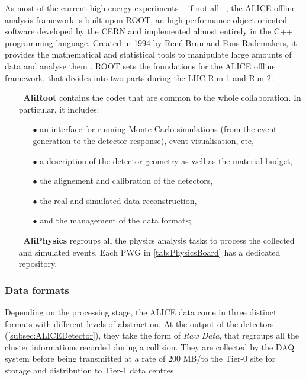 As most of the current high-energy experiments -- if not all --, the ALICE offline analysis framework is built upon ROOT, an high-performance object-oriented software developed by the CERN and implemented almost entirely in the C++ programming language. Created in 1994 by René Brun and Fons Rademakers, it provides the mathematical and statistical tools to manipulate large amounts of data and analyse them \cite{renebrunandfonsrademakersROOTObjectOriented}. ROOT sets the foundations for the ALICE offline framework, that divides into two parts during the LHC Run-1 and Run-2:
\begin{itemize}
\item[$\ $] \textbf{AliRoot} \cite{alicecollaborationAliRoot} contains the codes that are common to the whole collaboration. In particular, it includes:
\begin{itemize}
\item[$\bullet$] an interface for running Monte Carlo simulations (from the event generation to the detector response), event visualisation, etc,
\item[$\bullet$] a description of the detector geometry as well as the material budget,
\item[$\bullet$] the alignement and calibration of the detectors, 
\item[$\bullet$] the real and simulated data reconstruction,
\item[$\bullet$] and the management of the data formats;
\end{itemize}
\item[$\ $] \textbf{AliPhysics} \cite{alicecollaborationAliPhysics2023} regroups all the physics analysis tasks to process the collected and simulated events. Each PWG in \tab\ref{tab:PhysicsBoard} has a dedicated repository.
\end{itemize}

\subsubsection{Data formats}
\label{subsubsec:DataFormats}

Depending on the processing stage, the ALICE data come in three distinct formats with different levels of abstraction. At the output of the detectors (\Sec\ref{subsec:ALICEDetector}), they take the form of \textit{Raw Data}, that regroups all the cluster informations recorded during a collision. They are collected by the DAQ system before being transmitted at a rate of 200 MB/\second to the Tier-0 site for storage and distribution to Tier-1 data centres. 

